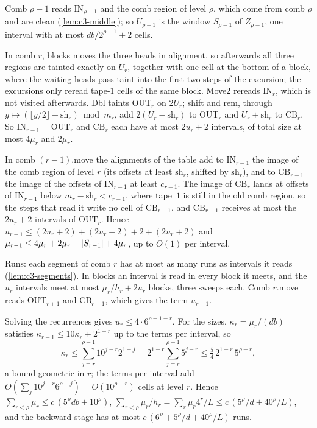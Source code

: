 \begin{informalproof}
Comb $\rho-1$ reads $\mathrm{IN}_{\rho-1}$ and the comb region of level $\rho$, which come from comb $\rho$ and are clean
(\cref{lem:c3-middle}); so $U_{\rho-1}$ is the window $S_{\rho-1}$ of $Z_{\rho-1}$, one interval with at most $db/2^{\rho-1}+2$ cells.

In comb $r$, blocks moves the three heads in alignment, so afterwards all three regions are tainted exactly on $U_r$, together with
one cell at the bottom of a block, where the waiting heads pass taint into the first two steps of the excursion; the excursions only
reread tape-$1$ cells of the same block. Move2 rereads $\mathrm{IN}_r$, which is not visited afterwards. Dbl taints $\mathrm{OUT}_r$ on
$2U_r$; shift and rem, through $y\mapsto(\lfloor y/2\rfloor+\mathrm{sh}_r)\bmod m_r$, add $2(U_r-\mathrm{sh}_r)$ to $\mathrm{OUT}_r$
and $U_r+\mathrm{sh}_r$ to $\mathrm{CB}_r$. So $\mathrm{IN}_{r-1}=\mathrm{OUT}_r$ and $\mathrm{CB}_r$ each have at most $2u_r+2$
intervals, of total size at most $4\mu_r$ and $2\mu_r$.

In comb $(r-1)$.move the alignments of the table add to $\mathrm{IN}_{r-1}$ the image of the comb region of level $r$ (its offsets at
least $\mathrm{sh}_r$, shifted by $\mathrm{sh}_r$), and to $\mathrm{CB}_{r-1}$ the image of the offsets of $\mathrm{IN}_{r-1}$ at least
$c_{r-1}$. The image of $\mathrm{CB}_r$ lands at offsets of $\mathrm{IN}_{r-1}$ below $m_r-\mathrm{sh}_r<c_{r-1}$, where tape~$1$ is still
in the old comb region, so the steps that read it write no cell of $\mathrm{CB}_{r-1}$, and $\mathrm{CB}_{r-1}$ receives at most the
$2u_r+2$ intervals of $\mathrm{OUT}_r$. Hence $u_{r-1}\le(2u_r+2)+(2u_r+2)+2+(2u_r+2)$ and
$\mu_{r-1}\le4\mu_r+2\mu_r+\lvert S_{r-1} \rvert+4\mu_r$, up to $O(1)$ per interval.

Runs: each segment of comb $r$ has at most as many runs as intervals it reads (\cref{lem:c3-segments}). In blocks an interval is read
in every block it meets, and the $u_r$ intervals meet at most $\mu_r/h_r+2u_r$ blocks, three sweeps each. Comb $r$.move reads
$\mathrm{OUT}_{r+1}$ and $\mathrm{CB}_{r+1}$, which gives the term $u_{r+1}$.
\end{informalproof}

Solving the recurrences gives $u_r\le4\cdot6^{\rho-1-r}$. For the sizes, $\kappa_r=\mu_r/(db)$ satisfies $\kappa_{r-1}\le10\kappa_r+2^{1-r}$
up to the terms per interval, so
\[
  \kappa_r\le\sum_{j=r}^{\rho-1}10^{j-r}2^{1-j}=2^{1-r}\sum_{j=r}^{\rho-1}5^{j-r}\le\tfrac54\,2^{1-r}\,5^{\rho-r},
\]
a bound geometric in $r$; the terms per interval add $O(\sum_j10^{j-r}6^{\rho-j})=O(10^{\rho-r})$ cells at level $r$. Hence
$\sum_{r<\rho}\mu_r\le c\,(5^\rho db+10^\rho)$, $\sum_{r<\rho}\mu_r/h_r=\sum_r\mu_r4^r/L\le c\,(5^\rho/d+40^\rho/L)$, and the backward
stage has at most $c\,(6^\rho+5^\rho/d+40^\rho/L)$ runs.

